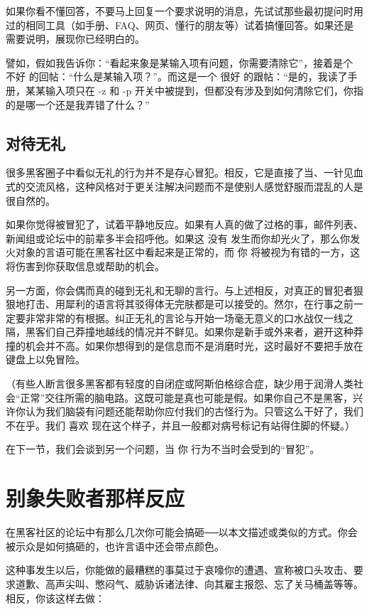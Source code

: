 如果你看不懂回答，不要马上回复一个要求说明的消息，先试试那些最初提问时用过的相同工具（如手册、FAQ、网页、懂行的朋友等）试着搞懂回答。如果还是需要说明，展现你已经明白的。

譬如，假如我告诉你：“看起来象是某输入项有问题，你需要清除它”，接着是个 不好 的回帖：“什么是某输入项？”。而这是一个 很好 的跟帖：“是的，我读了手册，某某输入项只在 -z 和 -p 开关中被提到，但都没有涉及到如何清除它们，你指的是哪一个还是我弄错了什么？”


\subsection{对待无礼}


很多黑客圈子中看似无礼的行为并不是存心冒犯。相反，它是直接了当、一针见血式的交流风格，这种风格对于更关注解决问题而不是使别人感觉舒服而混乱的人是很自然的。

如果你觉得被冒犯了，试着平静地反应。如果有人真的做了过格的事，邮件列表、新闻组或论坛中的前辈多半会招呼他。如果这 没有 发生而你却光火了，那么你发火对象的言语可能在黑客社区中看起来是正常的，而 你 将被视为有错的一方，这将伤害到你获取信息或帮助的机会。

另一方面，你会偶而真的碰到无礼和无聊的言行。与上述相反，对真正的冒犯者狠狠地打击、用犀利的语言将其驳得体无完肤都是可以接受的。然尔，在行事之前一定要非常非常的有根据。纠正无礼的言论与开始一场毫无意义的口水战仅一线之隔，黑客们自己莽撞地越线的情况并不鲜见。如果你是新手或外来者，避开这种莽撞的机会并不高。如果你想得到的是信息而不是消磨时光，这时最好不要把手放在键盘上以免冒险。

（有些人断言很多黑客都有轻度的自闭症或阿斯伯格综合症，缺少用于润滑人类社会“正常”交往所需的脑电路。这既可能是真也可能是假。如果你自己不是黑客，兴许你认为我们脑袋有问题还能帮助你应付我们的古怪行为。只管这么干好了，我们不在乎。我们 喜欢 现在这个样子，并且一般都对病号标记有站得住脚的怀疑。）

在下一节，我们会谈到另一个问题，当 你 行为不当时会受到的“冒犯”。





\section{别象失败者那样反应}

在黑客社区的论坛中有那么几次你可能会搞砸──以本文描述或类似的方式。你会被示众是如何搞砸的，也许言语中还会带点颜色。

这种事发生以后，你能做的最糟糕的事莫过于哀嚎你的遭遇、宣称被口头攻击、要求道歉、高声尖叫、憋闷气、威胁诉诸法律、向其雇主报怨、忘了关马桶盖等等。相反，你该这样去做：

